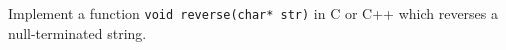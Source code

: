  \label{sssec:ex1_02}

Implement a function \texttt{void reverse(char* str)} in C or C++ which reverses a null-terminated string.



